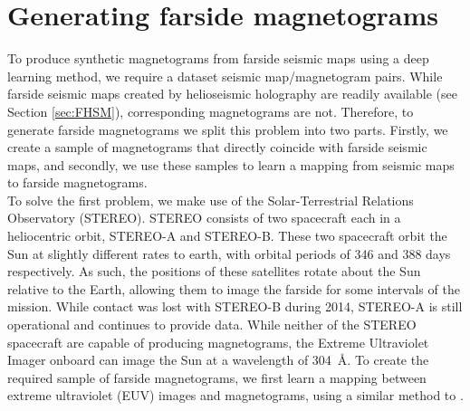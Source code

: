 \documentclass[11pt,a4paper,onecolumn]{report}
\begin{document}
\section{Generating farside magnetograms}


To produce synthetic magnetograms from farside seismic maps using a deep
learning method, we require a dataset seismic map/magnetogram pairs. While
farside seismic maps created by helioseismic holography are readily available
(see Section \ref{sec:FHSM}), corresponding magnetograms are not. Therefore, to
generate farside magnetograms we split this problem into two parts. Firstly, we
create a sample of magnetograms that directly coincide with farside seismic
maps, and secondly, we use these samples to learn a mapping from seismic
maps to farside magnetograms. \\

To solve the first problem, we make use of the Solar-Terrestrial Relations
Observatory (STEREO). STEREO consists of two spacecraft each in a heliocentric
orbit, STEREO-A and STEREO-B. These two spacecraft orbit the Sun at slightly
different rates to earth, with orbital periods of 346 and 388 days respectively.
As such, the positions of these satellites rotate about the Sun relative to the
Earth, allowing them to image the farside for some intervals of the mission.
While contact was lost with STEREO-B during 2014, STEREO-A is still operational
and continues to provide data. While neither of the STEREO spacecraft are
capable of producing magnetograms, the Extreme Ultraviolet Imager onboard can
image the Sun at a wavelength of \SI{304}{\angstrom}. To create the required
sample of farside magnetograms, we first learn a mapping between extreme
ultraviolet (EUV) images and magnetograms, using a similar method to
\citet{Kim2019}.\\
\end{document}

